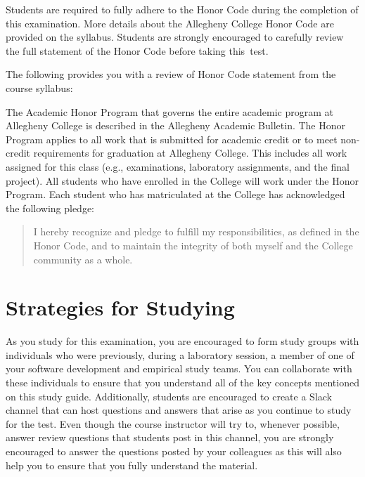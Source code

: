 \noindent Students are required to fully adhere to the Honor Code during the completion of this examination. More
details about the Allegheny College Honor Code are provided on the syllabus. Students are strongly encouraged to
carefully review the full statement of the Honor Code before taking \mbox{this test}.

\noindent The following provides you with a review of Honor Code statement from the course syllabus:

The Academic Honor Program that governs the entire academic program at Allegheny College is described in the Allegheny
Academic Bulletin.  The Honor Program applies to all work that is submitted for academic credit or to meet non-credit
requirements for graduation at Allegheny College.  This includes all work assigned for this class (e.g., examinations,
laboratory assignments, and the final project).  All students who have enrolled in the College will work under the Honor
Program.  Each student who has matriculated at the College has acknowledged the following pledge:

\vspace*{-.11in}
\begin{quote}
  I hereby recognize and pledge to fulfill my responsibilities, as defined in the Honor Code, and to maintain the
  integrity of both myself and the College community as a whole.
\end{quote}
\vspace*{-.11in}

\vspace*{-.2in}
\section*{Strategies for Studying}
\vspace*{-.1in}

As you study for this examination, you are encouraged to form study groups with individuals who were previously, during
a laboratory session, a member of one of your software development and empirical study teams. You can collaborate with
these individuals to ensure that you understand all of the key concepts mentioned on this study guide. Additionally,
students are encouraged to create a Slack channel that can host questions and answers that arise as you continue to
study for the test.  Even though the course instructor will try to, whenever possible, answer review questions that
students post in this channel, you are strongly encouraged to answer the questions posted by your colleagues as this
will also help you to ensure that you fully understand the material.

